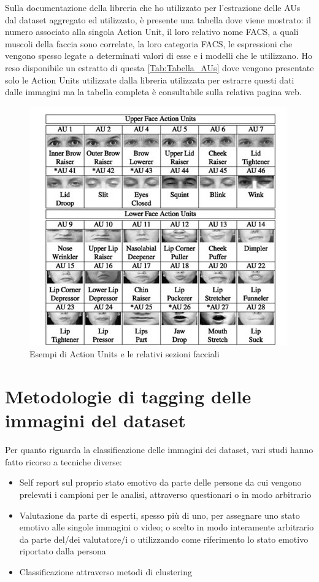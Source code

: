 Sulla documentazione della libreria che ho utilizzato per l’estrazione delle AUs dal dataset aggregato ed utilizzato, è presente una tabella dove viene mostrato: il numero associato alla singola Action Unit, il loro relativo nome FACS, a quali muscoli della faccia sono correlate, la loro categoria FACS, le espressioni che vengono spesso legate a determinati valori di esse e i modelli che le utilizzano. Ho reso disponibile un estratto di questa \ref{Tab:Tabella_AUs} dove vengono presentate solo le Action Units utilizzate dalla libreria \cite{PyFeat} utilizzata per estrarre questi dati dalle immagini ma la tabella completa è consultabile sulla relativa pagina web.
\newpage
\begin{figure}
    \begin{center}    
        \includegraphics[width=1\linewidth]{images/10.jpg}
        \caption{Esempi di Action Units e le relativi sezioni facciali}
    \end{center}
\end{figure}


\section{Metodologie di tagging delle immagini del dataset}
Per quanto riguarda la classificazione delle immagini dei dataset, vari studi hanno fatto ricorso a tecniche diverse:
\begin{itemize}
    \item Self report sul proprio stato emotivo da parte delle persone da cui vengono prelevati i campioni per le analisi, attraverso questionari o in modo arbitrario
    \item Valutazione da parte di esperti, spesso più di uno, per assegnare uno stato emotivo alle singole immagini o video; o scelto in modo interamente arbitrario da parte del/dei valutatore/i o utilizzando come riferimento lo stato emotivo riportato dalla persona
    \item Classificazione attraverso metodi di clustering \cite{FacialExpresRecLocalBinaryPatt}
\end{itemize}

